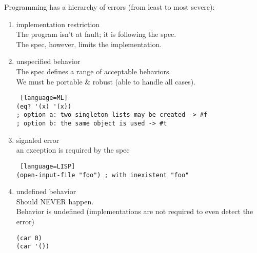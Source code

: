 \documentclass[../../lecture_notes.tex]{subfiles}
\begin{document}
Programming has a hierarchy of errors (from least to most severe): \begin{enumerate} [itemsep=0mm]
	\item implementation restriction\\
		The program isn’t at fault; it is following the spec.\\
		The spec, however, limits the implementation.
	\item unspecified behavior\\
		The spec defines a range of acceptable behaviors.\\
		We must be portable \& robust (able to handle all cases).\\
		\begin{lstlisting} [language=ML]
(eq? '(x) '(x))
; option a: two singleton lists may be created -> #f
; option b: the same object is used -> #t
	\end{lstlisting}
	\item signaled error\\
		an exception is required by the spec
		\begin{lstlisting} [language=LISP]
(open-input-file "foo") ; with inexistent "foo"
		\end{lstlisting}
	\item undefined behavior\\
		Should NEVER happen.\\
		Behavior is undefined (implementations are not required to even detect the error)
		\begin{lstlisting}
(car 0)
(car '())
		\end{lstlisting}
\end{enumerate}
\end{document}

